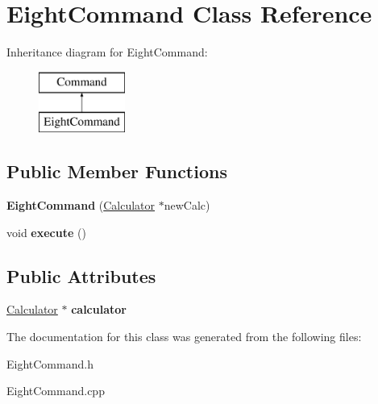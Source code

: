 \hypertarget{class_eight_command}{}\section{Eight\+Command Class Reference}
\label{class_eight_command}
Inheritance diagram for Eight\+Command\+:\begin{figure}[H]
\begin{center}
\leavevmode
\includegraphics[height=2.000000cm]{class_eight_command}
\end{center}
\end{figure}
\subsection*{Public Member Functions}
\begin{DoxyCompactItemize}
\item 
\hypertarget{class_eight_command_afe5d23069dc3e2baa96cf239e4164023}{}{\bfseries Eight\+Command} (\hyperlink{class_calculator}{Calculator} $\ast$new\+Calc)\label{class_eight_command_afe5d23069dc3e2baa96cf239e4164023}

\item 
\hypertarget{class_eight_command_afe2b90086e76b28a9adbcde328c1b2ce}{}void {\bfseries execute} ()\label{class_eight_command_afe2b90086e76b28a9adbcde328c1b2ce}

\end{DoxyCompactItemize}
\subsection*{Public Attributes}
\begin{DoxyCompactItemize}
\item 
\hypertarget{class_eight_command_aa4c2a48089ca694fc1122902fc5439c0}{}\hyperlink{class_calculator}{Calculator} $\ast$ {\bfseries calculator}\label{class_eight_command_aa4c2a48089ca694fc1122902fc5439c0}

\end{DoxyCompactItemize}


The documentation for this class was generated from the following files\+:\begin{DoxyCompactItemize}
\item 
Eight\+Command.\+h\item 
Eight\+Command.\+cpp\end{DoxyCompactItemize}
